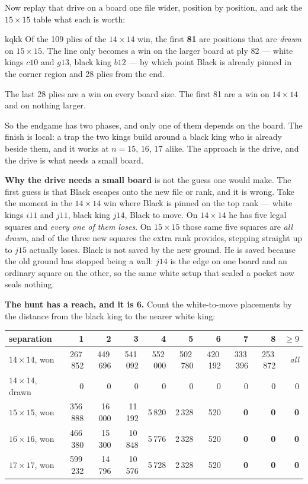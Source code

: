 \documentclass[11pt]{article}
\begin{document}
Now replay that drive on a board one file wider, position by position, and ask
the $15\times15$ table what each is worth:

\begin{result}[title={Three quarters of the win evaporates}]{kqkk}
Of the 109 plies of the $14\times14$ win, the first \textbf{81} are positions
that are \emph{drawn} on $15\times15$. The line only becomes a win on the larger
board at ply 82 --- white kings $c10$ and $g13$, black king $b12$ --- by which
point Black is already pinned in the corner region and 28 plies from the end.

The last 28 plies are a win on every board size. The first 81 are a win on
$14\times14$ and on nothing larger.
\end{result}

\noindent
So the endgame has two phases, and only one of them depends on the board. The
finish is local: a trap the two kings build around a black king who is already
beside them, and it works at $n=15$, $16$, $17$ alike. The approach is the drive,
and the drive is what needs a small board.

\textbf{Why the drive needs a small board} is not the guess one would make. The
first guess is that Black escapes onto the new file or rank, and it is wrong.
Take the moment in the $14\times14$ win where Black is pinned on the top rank ---
white kings $i11$ and $j11$, black king $j14$, Black to move. On $14\times14$ he
has five legal squares and \emph{every one of them loses}. On $15\times15$ those
same five squares are \emph{all drawn}, and of the three new squares the extra
rank provides, stepping straight up to $j15$ actually loses. Black is not saved
by the new ground. He is saved because the old ground has stopped being a wall:
$j14$ is the edge on one board and an ordinary square on the other, so the same
white setup that sealed a pocket now seals nothing.

\textbf{The hunt has a reach, and it is 6.} Count the white-to-move placements
by the distance from the black king to the nearer white king:

\begin{center}\small
\begin{tabular}{@{}lrrrrrrrrr@{}}
\toprule
separation & 1 & 2 & 3 & 4 & 5 & 6 & 7 & 8 & $\ge 9$\\
\midrule
$14\times14$, won   & 267\,852 & 449\,696 & 541\,092 & 552\,000 & 502\,780 & 420\,192 & 333\,396 & 253\,872 & \emph{all}\\
$14\times14$, drawn & 0 & 0 & 0 & 0 & 0 & 0 & 0 & 0 & 0\\
\midrule
$15\times15$, won   & 356\,888 & 16\,000 & 11\,192 & 5\,820 & 2\,328 & 520 & \textbf{0} & \textbf{0} & \textbf{0}\\
$16\times16$, won   & 466\,380 & 15\,300 & 10\,848 & 5\,776 & 2\,328 & 520 & \textbf{0} & \textbf{0} & \textbf{0}\\
$17\times17$, won   & 599\,232 & 14\,796 & 10\,576 & 5\,728 & 2\,328 & 520 & \textbf{0} & \textbf{0} & \textbf{0}\\
\bottomrule
\end{tabular}
\end{center}
\end{document}
